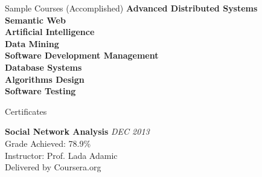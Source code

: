\documentclass{resume} %
\begin{document}
\begin{rSection}{Sample Courses (Accomplished)}
	{\bf Advanced Distributed Systems} \\
	{\bf Semantic Web} \\
	{\bf Artificial Intelligence} \\
	{\bf Data Mining} \\
	{\bf Software Development Management } \\
	{\bf Database Systems } \\
	{\bf Algorithms Design } \\
	{\bf Software Testing} 
	
\end{rSection}
\begin{rSection}{Certificates}
	
	{\bf Social Network Analysis} \hfill {\em DEC 2013}
	\\Grade Achieved: 78.9\%
	\\Instructor: Prof. Lada Adamic
	\\Delivered by Coursera.org
\end{rSection}
\end{document}
